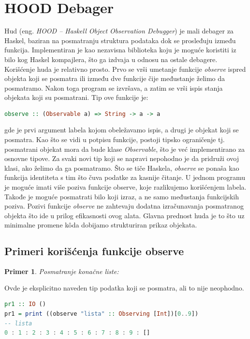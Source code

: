 \documentclass[a4paper]{article}
\newtheorem{primer}{Primer}[section]
\begin{document}
{{ 

\section{HOOD Debager}
Hud (eng. {\em HOOD -- Haskell Object Observation Debugger}) je mali debager za Haskel, baziran na posmatranju struktura podataka dok se prosleđuju između funkcija.\cite{hood}
Implementiran je kao nezavisna biblioteka koju je moguće koristiti iz bilo kog Haskel kompajlera, što ga izdvaja u odnosu na ostale debagere.
Korišćenje huda je relativno prosto. Prvo se vrši umetanje funkcije {\em observe} ispred objekta koji se posmatra ili između dve funkcije čije međustanje želimo da posmatramo.
Nakon toga program se izvršava, a zatim se vrši ispis stanja objekata koji su posmatrani.
Tip ove funkcije je:\newline \newline

\begin{lstlisting}[language=Haskell]
observe :: (Observable a) => String -> a -> a
\end{lstlisting} 

gde je prvi argument labela kojom obeležavamo ispis, a drugi je objekat koji se posmatra.
Kao što se vidi u potpisu funkcije, postoji tipsko ograničenje tj. posmatrani objekat mora da bude klase {\em Observable}, što je već implementirano za osnovne tipove.
Za svaki novi tip koji se napravi nepohodno je da  pridruži ovoj klasi, ako želimo da ga posmatramo.
Što se tiče Haskela, {\em observe} se ponaša kao funkcija identiteta s tim što čuva podatke za kasnije čitanje.
U jednom programu je moguće imati više poziva funkcije observe, koje razlikujemo korišćenjem labela.
Takođe je moguće posmatrati bilo koji izraz, a ne samo međustanja funkcijskih poziva.
Pozivi funkcije {\em observe} ne zahtevaju dodatna izračunavanja posmatranog objekta što ide u prilog efikasnosti ovog alata.\cite{declarative}
Glavna prednost huda je to što uz minimalne promene k\^{o}da dobijamo strukturiran prikaz objekata.

\subsection{Primeri korišćenja funkcije observe}
\begin{primer}
 Posmatranje konačne liste:
\end{primer}
Ovde je eksplicitno naveden tip podatka koji se posmatra, ali to nije neophodno.
\begin{lstlisting}[language=Haskell]
pr1 :: IO ()
pr1 = print ((observe "lista" :: Observing [Int])[0..9])
-- lista
0 : 1 : 2 : 3 : 4 : 5 : 6 : 7 : 8 : 9 : []
\end{lstlisting}

}}
\end{document}
